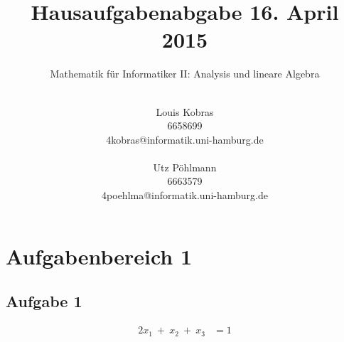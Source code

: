 \documentclass[fleqn,12pt, paper=a4,sffamily]{scrreprt}
\title{Hausaufgabenabgabe 16. April 2015}
\subtitle{Mathematik für Informatiker II: Analysis und lineare Algebra}
\author{\\
    \huge{Louis Kobras}\\\large{6658699}\\\large{4kobras@informatik.uni-hamburg.de} \\ \\
    \huge{Utz Pöhlmann}\\\large{6663579}\\\large{4poehlma@informatik.uni-hamburg.de}
    }
\date{}
\let\stdsection\section
\renewcommand\section{\stdsection}
\begin{document}
    \maketitle
    \newpage
    \section*{Aufgabenbereich 1}
        \subsection*{Aufgabe 1}
            \begin{equation*}
                \begin{split}
                    2x_1~+~x_2~+~x_3 &=1
                \end{split}
            \end{equation*}
                
            
\end{document}

